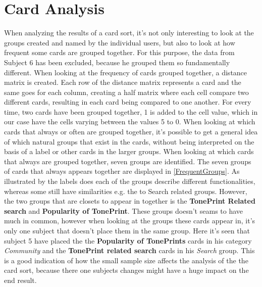 \section{Card Analysis}
\label{CardAnalysis}
When analyzing the results of a card sort, it's not only interesting to look at the groups created and named by the individual users, but also to look at how frequent some cards are grouped together. For this purpose, the data from Subject 6 has been excluded, because he grouped them so fundamentally different. When looking at the frequency of cards grouped together, a distance matrix is created. Each row of the distance matrix represents a card and the same goes for each column, creating a half matrix where each cell compare two different cards, resulting in each card being compared to one another. For every time, two cards have been grouped together, 1 is added to the cell value, which in our case have the cells varying between the values 5 to 0. When looking at which cards that always or often are grouped together, it's possible to get a general idea of which natural groups that exist in the cards, without being interpreted on the basis of a label or other cards in the larger groups. When looking at which cards that always are grouped together, seven groups are identified. The seven groups of cards that always appears together are displayed in \autoref{FrequentGroups}. As illustrated by the labels does each of the groups describe different functionalities, whereas some still have similarities e.g. the to Search related groups. However, the two groups that are closets to appear in together is the \textbf{TonePrint Related search} and \textbf{Popularity of TonePrint}. These groups doesn't seams to have much in common, however when looking at the groups these cards appear in, it's only one subject that doesn't place them in the same group. Here it's seen that subject 5 have placed the the \textbf{Popularity of TonePrints} cards in his category \textit{Community} and the \textbf{TonePrint related search} cards in his \textit{Search} group. This is a good indication of how the small sample size affects the analysis of the the card sort, because there one subjects changes might have a huge impact on the end result. 

